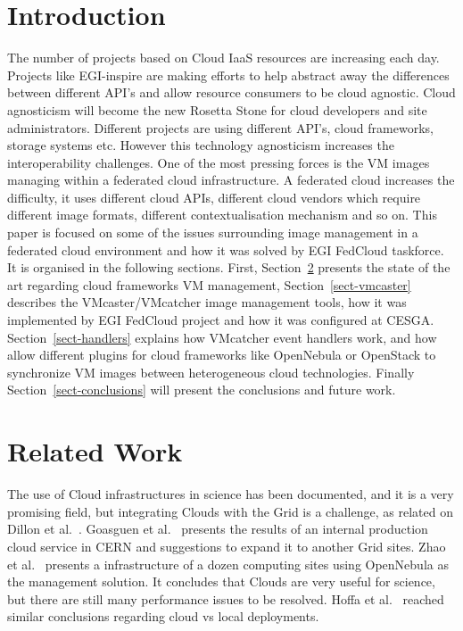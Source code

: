 \documentclass{llncs_Ibergrid2013}
\begin{document}
\section{Introduction}
\label{sect-introduction}
%
The number of projects based on Cloud IaaS resources are increasing each day. Projects like EGI-inspire are making efforts to help abstract away the differences between different API's and allow resource consumers to be cloud agnostic.
Cloud agnosticism will become the new Rosetta Stone for cloud developers and site administrators. Different projects are using different API's, cloud frameworks, storage systems etc. 
However this technology agnosticism increases the interoperability challenges. One of the most pressing forces is the VM images managing within a federated cloud infrastructure.
A federated cloud increases the difficulty, it uses different cloud APIs, different cloud vendors which require different image formats, different contextualisation mechanism and so on. 
This paper is focused on some of the issues surrounding image management in a federated cloud environment and how it was solved by EGI FedCloud taskforce.
It is organised in the following sections. First, Section~\ref{sect-relatedwork} presents the state of the art regarding cloud frameworks VM management, Section~\ref{sect-vmcaster} describes the VMcaster/VMcatcher image management tools, how it was implemented by EGI FedCloud project and how it was configured at CESGA. 
Section~\ref{sect-handlers} explains how VMcatcher event handlers work, and how allow different plugins for cloud frameworks like OpenNebula or OpenStack to synchronize VM images between heterogeneous cloud technologies. 
Finally Section~\ref{sect-conclusions} will present the conclusions and future work.  



\section{Related Work}
\label{sect-relatedwork}
The use of Cloud infrastructures in science has been documented, and it is a very promising field, but integrating Clouds with the Grid is a challenge, as related on Dillon et al.~\cite{Dillon2010}. Goasguen et al.~\cite{Goasguen2012} presents the results of an internal production cloud service in CERN and suggestions to expand it to another Grid sites. Zhao et al.~\cite{Zhao2012} presents a infrastructure of a dozen computing sites using OpenNebula as the management solution. It concludes that Clouds are very useful for science, but there are still many performance issues to be resolved. Hoffa et al.~\cite{Hoffa2008} reached similar conclusions regarding cloud vs local deployments.
\end{document}
